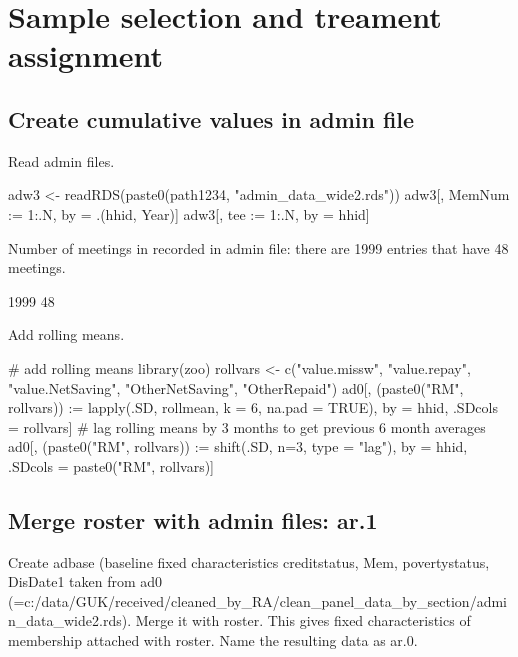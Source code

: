 \section{Sample selection and treament assignment}

\subsection{Create cumulative values in admin file}

Read admin files.
\begin{Schunk}
\begin{Sinput}
adw3 <- readRDS(paste0(path1234, "admin_data_wide2.rds"))
adw3[, MemNum := 1:.N, by = .(hhid, Year)]
adw3[, tee := 1:.N, by = hhid]
\end{Sinput}
\end{Schunk}

Number of meetings in recorded in admin file: there are 1999 entries that have 48 meetings.
\begin{Schunk}
\begin{Soutput}

1999 
  48 
\end{Soutput}
\end{Schunk}


Add rolling means.
\begin{Schunk}
\begin{Sinput}
# add rolling means
library(zoo)
rollvars <- c("value.missw", "value.repay", "value.NetSaving", "OtherNetSaving", "OtherRepaid")
ad0[, (paste0("RM", rollvars)) := lapply(.SD, rollmean, k = 6, na.pad = TRUE), 
   by = hhid, .SDcols = rollvars]
  # lag rolling means by 3 months to get previous 6 month averages	
ad0[, (paste0("RM", rollvars)) := shift(.SD, n=3, type = "lag"), 
   by = hhid, .SDcols = paste0("RM", rollvars)]
\end{Sinput}
\end{Schunk}


\subsection{Merge roster with admin files: \textsf{ar.1}}

Create \textsf{adbase} (baseline fixed characteristics creditstatus, Mem, povertystatus, DisDate1 taken from \textsf{ad0} (={\footnotesize c:/data/GUK/received/cleaned\_by\_RA/clean\_panel\_data\_by\_section/admin\_data\_wide2.rds}). Merge it with roster. This gives fixed characteristics of membership attached with roster. Name the resulting data as \textsf{ar.0}.

